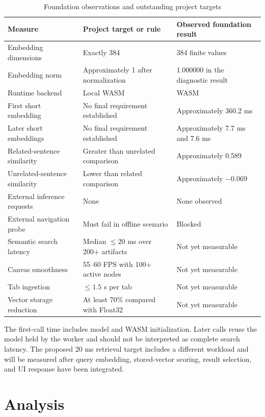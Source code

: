 \documentclass{tietreport}
\begin{document}
\begin{table}[htbp]
\centering
\small
\begin{tabularx}{\textwidth}{@{}Yp{0.27\textwidth}p{0.23\textwidth}@{}}
\toprule
\textbf{Measure} & \textbf{Project target or rule} & \textbf{Observed foundation result} \\
\midrule
Embedding dimensions & Exactly 384 & 384 finite values \\
Embedding norm & Approximately 1 after normalization & 1.000000 in the diagnostic result \\
Runtime backend & Local WASM & WASM \\
First short embedding & No final requirement established & Approximately 360.2 ms \\
Later short embeddings & No final requirement established & Approximately 7.7 ms and 7.6 ms \\
Related-sentence similarity & Greater than unrelated comparison & Approximately 0.589 \\
Unrelated-sentence similarity & Lower than related comparison & Approximately $-0.069$ \\
External inference requests & None & None observed \\
External navigation probe & Must fail in offline scenario & Blocked \\
Semantic search latency & Median $\leq 20$ ms over 200+ artifacts & Not yet measurable \\
Canvas smoothness & 55--60 FPS with 100+ active nodes & Not yet measurable \\
Tab ingestion & $\leq 1.5$ s per tab & Not yet measurable \\
Vector storage reduction & At least 70\% compared with Float32 & Not yet measurable \\
\bottomrule
\end{tabularx}
\caption{Foundation observations and outstanding project targets}
\label{tab:results}
\end{table}

The first-call time includes model and WASM initialization. Later calls reuse the model held
by the worker and should not be interpreted as complete search latency. The proposed 20 ms
retrieval target includes a different workload and will be measured after query embedding,
stored-vector scoring, result selection, and UI response have been integrated.

\section{Analysis}
\end{document}
